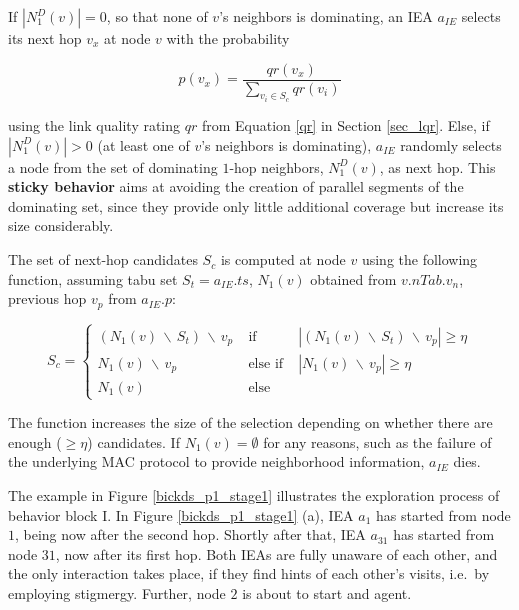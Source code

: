 If $|N_1^D(v)|=0$, so that none of $v$'s neighbors is dominating, an IEA $a_{IE}$ selects its next hop $v_x$ at node $v$ with the probability 
	 
	 \begin{equation}
	 p(v_x)=\frac{qr(v_x)}{\sum_{v_i \in S_{c}}{qr(v_i)}}
	\label{pvx}
\end{equation}

using the link quality rating $qr$ from Equation \ref{qr} in Section \ref{sec_lqr}. Else, if $|N_1^D(v)|>0$ (at least one of $v$'s neighbors is dominating), $a_{IE}$ randomly selects a node from the set of dominating $1$-hop neighbors, $N_1^D(v)$, as next hop. This \textbf{sticky behavior} aims at avoiding the creation of parallel segments of the dominating set, since they provide only little additional coverage but increase its size considerably.

The set of next-hop candidates $S_c$ is computed at node $v$ using the following function, assuming tabu set $S_t=a_{IE}.ts$, $N_1(v)$ obtained from $v.nTab.v_n$, previous hop $v_p$ from $a_{IE}.p$:

	\begin{equation}\label{sc}
			S_c= \left\{ \begin{array}{rll}
	 			 (N_1(v) \,\backslash\, S_t) \,\backslash\, v_p & \; \mbox{if} \; & |(N_1(v) \,\backslash\, S_t) \,\backslash\, v_p| \geq \eta\\
	 			 N_1(v) \,\backslash\, v_p & \; \mbox{else if} \; & |N_1(v) \,\backslash\, v_p| \geq \eta\\
	 			 N_1(v) & \; \mbox{else}
	 			\end{array}\right.
		\end{equation}
		
The function increases the size of the selection depending on whether there are enough ($\geq \eta$) candidates. If $N_1(v)=\emptyset$ for any reasons, such as the failure of the underlying MAC protocol to provide neighborhood information, $a_{IE}$ dies.




\exampleBegin 
The example in Figure \ref{bickds_p1_stage1} illustrates the exploration process of behavior block I. In Figure \ref{bickds_p1_stage1} (a), IEA $a_1$ has started from node $1$, being now after the second hop. Shortly after that, IEA $a_{31}$ has started from node $31$, now after its first hop. Both IEAs are fully unaware of each other, and the only interaction takes place, if they find hints of each other's visits, i.e.\ by employing stigmergy. Further, node $2$ is about to start and agent.

